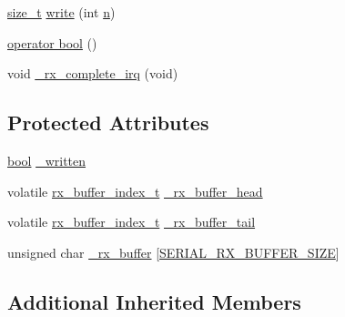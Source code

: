 \begin{DoxyCompactItemize}
\item 
\hyperlink{stddef_8h_aa9d55e2f20e580b7445617d0d12fff6e}{size\-\_\-t} \hyperlink{classHardwareSerial_a4d67d5698c572032d98ad445d3b4f897}{write} (int \hyperlink{OWGeneric__SensorStation_8ino_a7f72c6c4ce2ae87fa6fe5f6f22cd9d67}{n})
\item 
\hyperlink{classHardwareSerial_a3038bc051efae1dac1ad3eb39f18f7ea}{operator bool} ()
\item 
void \hyperlink{classHardwareSerial_a7c5fd965cba330e7b3cd0f547251c520}{\-\_\-rx\-\_\-complete\-\_\-irq} (void)
\end{DoxyCompactItemize}
\subsection*{Protected Attributes}
\begin{DoxyCompactItemize}
\item 
\hyperlink{stdbool_8h_abb452686968e48b67397da5f97445f5b}{bool} \hyperlink{classHardwareSerial_af8b285e1c8ce2e9a0b83c59c5cfd574b}{\-\_\-written}
\item 
volatile \hyperlink{HardwareSerial_8h_a335e37d0726278844b068d565a4e66b7}{rx\-\_\-buffer\-\_\-index\-\_\-t} \hyperlink{classHardwareSerial_ac6fe1f875521caeb248fa9b477338ff3}{\-\_\-rx\-\_\-buffer\-\_\-head}
\item 
volatile \hyperlink{HardwareSerial_8h_a335e37d0726278844b068d565a4e66b7}{rx\-\_\-buffer\-\_\-index\-\_\-t} \hyperlink{classHardwareSerial_a891eab42df821ab76c2a273e0a78195e}{\-\_\-rx\-\_\-buffer\-\_\-tail}
\item 
unsigned char \hyperlink{classHardwareSerial_a3e915f174853e1acdfbacaea53f14d09}{\-\_\-rx\-\_\-buffer} \mbox{[}\hyperlink{HardwareSerial_8h_aba0ceec384cf3acb51e0d6f45f31379c}{S\-E\-R\-I\-A\-L\-\_\-\-R\-X\-\_\-\-B\-U\-F\-F\-E\-R\-\_\-\-S\-I\-Z\-E}\mbox{]}
\end{DoxyCompactItemize}
\subsection*{Additional Inherited Members}


